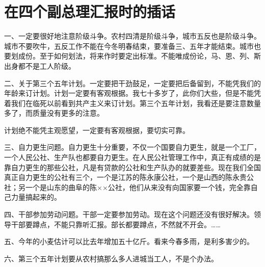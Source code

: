\section[在四个副总理汇报时的插话（一九六四年五月）]{在四个副总理汇报时的插话}


一、一定要很好地注意阶级斗争。农村四清是阶级斗争，城市五反也是阶级斗争。城市不要吹牛，五反工作不能在今冬明春结束，要准备三、五年才能结束。城市也要划成份。至于如何划法，将来作时要定出标准。不能唯成份论，马、恩、列、斯出身都不是工人阶级。

二、关于第三个五年计划。一定要把干劲鼓足，一定要把后备留到，不能凭我们的年龄来订计划。计划一定要有客观根据。我七十多岁了，此你们大些，但是不能凭着我们在临死以前看到共产主义来订计划。第三个五年计划，我看还是要注意数量多了，而质量没有更多的注意。

计划绝不能凭主观愿望，一定要有客观根据，要切实可靠。

三、自力更生问题。自力更生十分重要，不仅一个国要自力更生，就是一个工厂，一个人民公社、生产队也都要自力更生。在人民公社管理工作中，真正有成绩的是靠自力更生的那些公社，凡是有贷款的公社和生产队办的就要差些。现在我们全国真正自力更生的公社有三个，一个是江苏的陈永康公社，一个是山西的陈永贵公社；另一个是山东的曲阜的陈××公社，他们从来没有向国家要一个钱，完全靠自己力量搞起来的。

四、干部参加劳动问题。干部一定要参加劳动。现在这个问题还没有很好解决。领导干部要蹲点，不能只靠听汇报。部长都要蹲点，不然就不开会。……

五、今年的小麦估计可以比去年增加五十亿斤。看来今春多雨，是利多害少的。

六、第三个五年计划要从农村搞那么多人进城当工人，不是个办法。


